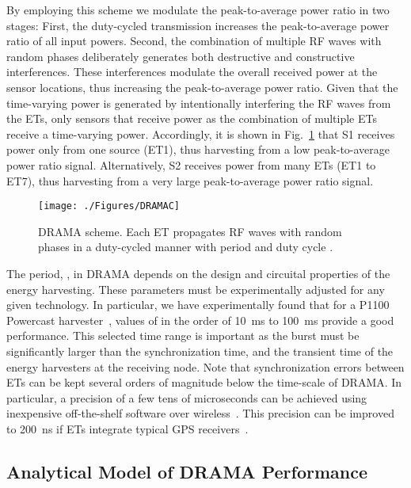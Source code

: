 \documentclass[conference]{IEEEtran}
\begin{document}
By employing this scheme we modulate the peak-to-average power ratio in two stages:
First, the duty-cycled transmission increases the peak-to-average power ratio of all input powers.
Second, the combination of multiple RF waves with random phases deliberately generates both destructive and constructive interferences. These interferences modulate the overall received power at the sensor locations, thus increasing the peak-to-average power ratio. 
Given that the time-varying power is generated by intentionally interfering the RF waves from the ETs, only sensors that receive power as the combination of multiple ETs receive a time-varying power. Accordingly, it is shown in Fig.~\ref{fig:mac-scheme} that S1 receives power only from one source (ET1), thus harvesting from a low peak-to-average power ratio signal. Alternatively, S2 receives power from many ETs (ET1 to ET7), thus harvesting from a very large peak-to-average power ratio signal.


\begin{figure}
  \centering
    \texttt{[image: ./Figures/DRAMAC]}
 \caption{DRAMA scheme. Each ET propagates RF waves with random phases  in a duty-cycled manner with period  and duty cycle .}
 \label{fig:mac-scheme}
 \vspace{0.0 cm}
\end{figure}


The period, , in DRAMA depends on the design and circuital  properties of the energy harvesting. These parameters must be experimentally adjusted for any given technology. In particular, we have experimentally found that for a P1100 Powercast harvester~\cite{P1110}, values of  in the order of 10~ms to 100~ms provide a good performance.
This selected time range  is important as the burst must be significantly larger than the synchronization time, and the transient time of the energy harvesters at the receiving node.
Note that synchronization errors between ETs can be kept several orders of magnitude below the time-scale of DRAMA. In particular, a precision of a few tens of microseconds can be achieved using inexpensive off-the-shelf software over wireless~\cite{synch-survey}. This precision can be improved to 200~ns if ETs integrate typical GPS receivers~\cite{GPS-timing}.

\subsection{Analytical Model of DRAMA Performance}
\end{document}
